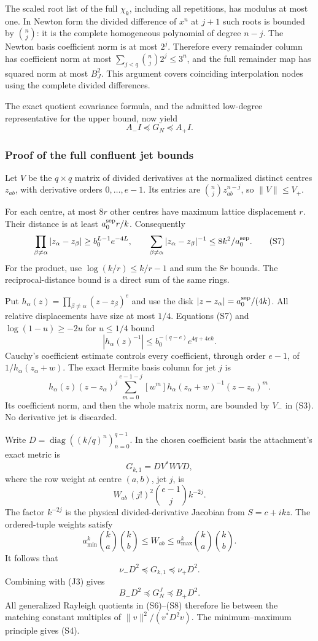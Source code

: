 \documentclass[11pt]{article}
\begin{document}
The scaled root list of the full \(\chi_k\), including all repetitions, has modulus at most one. In Newton form the divided difference of \(x^n\) at \(j+1\) such roots is bounded by \(\binom nj\): it is the complete homogeneous polynomial of degree \(n-j\). The Newton basis coefficient norm is at most \(2^j\). Therefore every remainder column has coefficient norm at most \(\sum_{j<q}\binom nj2^j\le3^n\), and the full remainder map has squared norm at most \(B_J^2\). This argument covers coinciding interpolation nodes using the complete divided differences.

The exact quotient covariance formula, and the admitted low-degree representative for the upper bound, now yield \[
 A_-I\preceq G_N\preceq A_+I. \tag{S6}
\]

\subsubsection{Proof of the full confluent jet bounds}\label{proof-of-the-full-confluent-jet-bounds}

Let \(V\) be the \(q\times q\) matrix of divided derivatives at the normalized distinct centres \(z_{ab}\), with derivative orders \(0,\ldots,e-1\). Its entries are \(\binom njz_{ab}^{n-j}\), so \(\|V\|\le V_+\).

For each centre, at most \(8r\) other centres have maximum lattice displacement \(r\). Their distance is at least \(a_0^{\rm sep}r/k\). Consequently \[
 \prod_{\beta\ne\alpha}|z_\alpha-z_\beta|
 \ge b_0^{L-1}e^{-4L},\qquad
 \sum_{\beta\ne\alpha}|z_\alpha-z_\beta|^{-1}
 \le8k^2/a_0^{\rm sep}. \tag{S7}
\] For the product, use \(\log(k/r)\le k/r-1\) and sum the \(8r\) bounds. The reciprocal-distance bound is a direct sum of the same rings.

Put \(h_\alpha(z)=\prod_{\beta\ne\alpha}(z-z_\beta)^e\) and use the disk \(|z-z_\alpha|=a_0^{\rm sep}/(4k)\). All relative displacements have size at most \(1/4\). Equations (S7) and \(\log(1-u)\ge-2u\) for \(u\le1/4\) bound \[
 |h_\alpha(z)^{-1}|
 \le b_0^{-(q-e)}e^{4q+4ek}.
\] Cauchy's coefficient estimate controls every coefficient, through order \(e-1\), of \(1/h_\alpha(z_\alpha+w)\). The exact Hermite basis column for jet \(j\) is \[
 h_\alpha(z)(z-z_\alpha)^j
 \sum_{m=0}^{e-1-j}
 [w^m]h_\alpha(z_\alpha+w)^{-1}(z-z_\alpha)^m.
\] Its coefficient norm, and then the whole matrix norm, are bounded by \(V_-\) in (S3). No derivative jet is discarded.

Write \(D=\operatorname{diag}((k/q)^n)_{n=0}^{q-1}\). In the chosen coefficient basis the attachment's exact metric is \[
 G_{k,1}=D V^*W V D,
\] where the row weight at centre \((a,b)\), jet \(j\), is \[
 W_{ab}\,(j!)^2\binom{e-1}{j}k^{-2j}.
\] The factor \(k^{-2j}\) is the physical divided-derivative Jacobian from \(S=c+ikz\). The ordered-tuple weights satisfy \[
 a_{\min}^k\binom ka\binom kb
 \le W_{ab}\le
 a_{\max}^k\binom ka\binom kb.
\] It follows that \[
 \nu_-D^2\preceq G_{k,1}\preceq\nu_+D^2.
\] Combining with (J3) gives \[
 B_-D^2\preceq G_N^J\preceq B_+D^2. \tag{S8}
\] All generalized Rayleigh quotients in (S6)--(S8) therefore lie between the matching constant multiples of \(\|v\|^2/(v^*D^2v)\). The minimum--maximum principle gives (S4).
\end{document}

